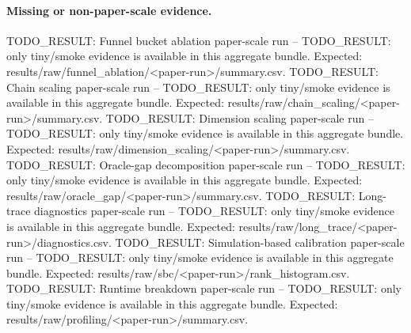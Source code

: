 \paragraph{Missing or non-paper-scale evidence.}
TODO_RESULT: Funnel bucket ablation paper-scale run -- TODO\_RESULT: only tiny/smoke evidence is available in this aggregate bundle. Expected: results/raw/funnel\_ablation/<paper-run>/summary.csv.
TODO_RESULT: Chain scaling paper-scale run -- TODO\_RESULT: only tiny/smoke evidence is available in this aggregate bundle. Expected: results/raw/chain\_scaling/<paper-run>/summary.csv.
TODO_RESULT: Dimension scaling paper-scale run -- TODO\_RESULT: only tiny/smoke evidence is available in this aggregate bundle. Expected: results/raw/dimension\_scaling/<paper-run>/summary.csv.
TODO_RESULT: Oracle-gap decomposition paper-scale run -- TODO\_RESULT: only tiny/smoke evidence is available in this aggregate bundle. Expected: results/raw/oracle\_gap/<paper-run>/summary.csv.
TODO_RESULT: Long-trace diagnostics paper-scale run -- TODO\_RESULT: only tiny/smoke evidence is available in this aggregate bundle. Expected: results/raw/long\_trace/<paper-run>/diagnostics.csv.
TODO_RESULT: Simulation-based calibration paper-scale run -- TODO\_RESULT: only tiny/smoke evidence is available in this aggregate bundle. Expected: results/raw/sbc/<paper-run>/rank\_histogram.csv.
TODO_RESULT: Runtime breakdown paper-scale run -- TODO\_RESULT: only tiny/smoke evidence is available in this aggregate bundle. Expected: results/raw/profiling/<paper-run>/summary.csv.
